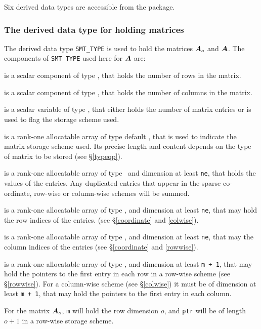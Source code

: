 \documentclass{galahad}
\begin{document}

\galtypes
Six derived data types are accessible from the package.


\subsubsection{The derived data type for holding matrices}\label{typesmt}
The derived data type {\tt SMT\_TYPE} is used to hold the matrices ${\bm{A}}_o$
and ${\bm{A}}$. The components of {\tt SMT\_TYPE} used here for ${\bm{A}}$
are:

\begin{description}

 is a scalar component of type \integer, 
that holds the number of rows in the matrix. 
 
 is a scalar component of type \integer, 
that holds the number of columns in the matrix. 
 
 is a scalar variable of type \integer, that either 
holds the number of matrix entries or is used to flag the storage scheme
used. 

 is a rank-one allocatable array of type default \character, that
is used to indicate the matrix storage scheme used. Its precise length and
content depends on the type of matrix to be stored (see \S\ref{typeqp}).

 is a rank-one allocatable array of type \realdp\, 
and dimension at least {\tt ne}, that holds the values of the entries. 
Any duplicated entries that appear in the sparse 
co-ordinate, row-wise or column-wise schemes will be summed. 

 is a rank-one allocatable array of type \integer, 
and dimension at least {\tt ne}, that may hold the row indices of the entries. 
(see \S\ref{coordinate} and \ref{colwise}).

 is a rank-one allocatable array of type \integer, 
and dimension at least {\tt ne}, that may the column indices of the entries
(see \S\ref{coordinate} and \ref{rowwise}).

 is a rank-one allocatable array of type \integer, 
and dimension at least {\tt m + 1}, that may hold the pointers to
the first entry in each row in a row-wise scheme (see \S\ref{rowwise}). 
For a column-wise scheme (see \S\ref{colwise}) it must be of 
dimension at least {\tt m + 1}, that may hold the pointers to
the first entry in each column.

\end{description}
For the matrix ${\bm{A}}_o$, {\tt m} will hold the row dimension $o$, and
{\tt ptr} will be of length $o+1$ in a row-wise storage scheme.
\end{document}
